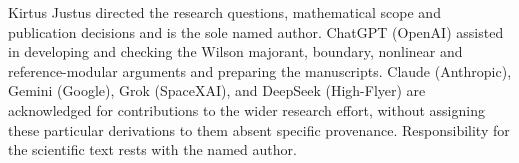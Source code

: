 \documentclass[
  10pt,
  a4paper,
]{article}
\begin{document}
Kirtus Justus directed the research questions, mathematical scope and publication decisions and is the sole named author. ChatGPT (OpenAI) assisted in developing and checking the Wilson majorant, boundary, nonlinear and reference-modular arguments and preparing the manuscripts. Claude (Anthropic), Gemini (Google), Grok (SpaceXAI), and DeepSeek (High-Flyer) are acknowledged for contributions to the wider research effort, without assigning these particular derivations to them absent specific provenance. Responsibility for the scientific text rests with the named author.
\end{document}
